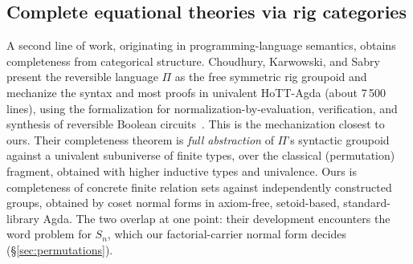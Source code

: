 \subsection{Complete equational theories via rig categories}\label{sec:rel-rig}

A second line of work, originating in programming-language semantics,
obtains completeness from categorical structure.
Choudhury, Karwowski, and Sabry present the reversible language $\Pi$ as
the free symmetric rig groupoid and mechanize the syntax and most proofs
in univalent HoTT-Agda (about 7\,500 lines), using the formalization for
normalization-by-evaluation, verification, and synthesis of reversible
Boolean circuits~\cite{choudhury2022symmetries}.  This is the
mechanization closest to ours.  Their completeness theorem is \emph{full
abstraction} of $\Pi$'s syntactic
groupoid against a univalent subuniverse of finite types, over the
classical (permutation) fragment, obtained with higher
inductive types and univalence.  Ours is completeness of concrete
finite relation sets against independently constructed groups, obtained
by coset normal forms in axiom-free, setoid-based, standard-library Agda.
The two overlap at one point: their development encounters the word
problem for $S_n$, which our factorial-carrier normal
form decides (\S\ref{sec:permutations}).

